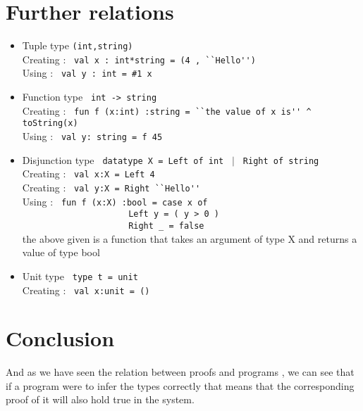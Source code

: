 \section{Further relations}
\begin{itemize}

  \item Tuple type \verb|(int,string)|\\
      Creating : \verb| val x : int*string = (4 , ``Hello'')|\\
      Using : \verb| val y : int = #1 x|\\
      
  \item Function type \verb| int -> string |\\
      Creating : \verb| fun f (x:int) :string = ``the value of x is'' ^ toString(x) |\\
      Using : \verb| val y: string = f 45|\\
    
  \item Disjunction type \verb| datatype X = Left of int | $|$  \verb| Right of string |\\
      Creating : \verb| val x:X = Left 4|\\
      Creating : \verb| val y:X = Right ``Hello'' |\\
      Using : \verb| fun f (x:X) :bool = case x of |\\
            \verb|                     Left y = ( y > 0 )|\\
              \verb|                     Right _ = false|\\
      the above given is a function that takes an argument of type X and returns a value of type bool\\
              
  \item Unit type \verb| type t = unit |\\
      Creating : \verb| val x:unit = () |\\
              
\end{itemize}

\section{Conclusion}

    And as we have seen the relation between proofs and programs , we can see that if a program were to infer
the types correctly that means that the corresponding proof of it will also hold true in the system.